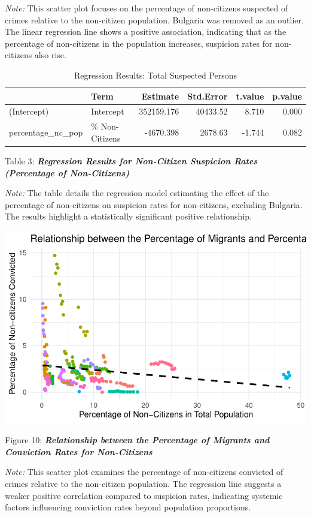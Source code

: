 \documentclass[
]{article}
\begin{document}
\emph{Note:} This scatter plot focuses on the percentage of non-citizens
suspected of crimes relative to the non-citizen population. Bulgaria was
removed as an outlier. The linear regression line shows a positive
association, indicating that as the percentage of non-citizens in the
population increases, suspicion rates for non-citizens also rise.

\begin{table}
\centering
\caption{Regression Results: Total Suspected Persons}
\centering
\begin{tabular}[t]{l|l|r|r|r|r}
\hline
  & Term & Estimate & Std.Error & t.value & p.value\\
\hline
(Intercept) & Intercept & 352159.176 & 40433.52 & 8.710 & 0.000\\
\hline
percentage\_nc\_pop & \% Non-Citizens & -4670.398 & 2678.63 & -1.744 & 0.082\\
\hline
\end{tabular}
\end{table}

Table 3: \textbf{\emph{Regression Results for Non-Citizen Suspicion
Rates (Percentage of Non-Citizens)}}

\emph{Note:} The table details the regression model estimating the
effect of the percentage of non-citizens on suspicion rates for
non-citizens, excluding Bulgaria. The results highlight a statistically
significant positive relationship.

\includegraphics{DataMan_Project_files/figure-pdf/unnamed-chunk-37-1.pdf}

Figure 10: \textbf{\emph{Relationship between the Percentage of Migrants
and Conviction Rates for Non-Citizens}}

\emph{Note:} This scatter plot examines the percentage of non-citizens
convicted of crimes relative to the non-citizen population. The
regression line suggests a weaker positive correlation compared to
suspicion rates, indicating systemic factors influencing conviction
rates beyond population proportions.
\end{document}
